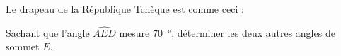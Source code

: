 
\begin{exercice}\label{exo2smath-0239}

    Le drapeau de la République Tchèque est comme ceci :
    \begin{center}

    \end{center}
    Sachant que l'angle \( \widehat{AED}\) mesure \SI{70}{\degree}, déterminer les deux autres angles de sommet \( E\).
    
\end{exercice}
